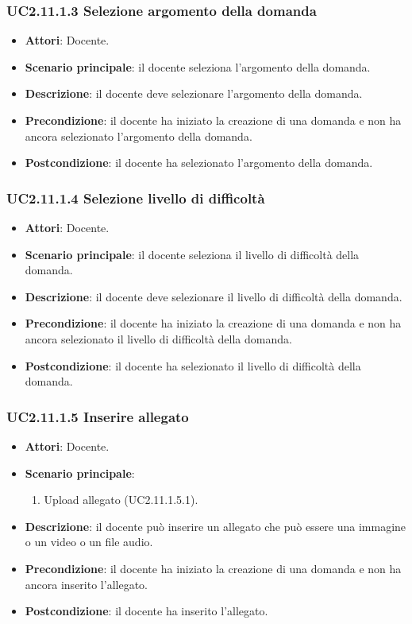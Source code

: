 \subsubsection{UC2.11.1.3 Selezione argomento della domanda}
\begin{itemize}
\item \textbf{Attori}: Docente.
\item \textbf{Scenario principale}: il docente seleziona l'argomento della domanda.
\item \textbf{Descrizione}: il docente deve selezionare l'argomento della domanda.
\item \textbf{Precondizione}: il docente ha iniziato la creazione di una domanda e non ha ancora selezionato l'argomento della domanda.
\item \textbf{Postcondizione}: il docente ha selezionato l'argomento della domanda.
\end{itemize}
\subsubsection{UC2.11.1.4 Selezione livello di difficoltà}
\begin{itemize}
\item \textbf{Attori}: Docente.
\item \textbf{Scenario principale}: il docente seleziona il livello di difficoltà della domanda.
\item \textbf{Descrizione}: il docente deve selezionare il livello di difficoltà della domanda.
\item \textbf{Precondizione}: il docente ha iniziato la creazione di una domanda e non ha ancora selezionato il livello di difficoltà della domanda.
\item \textbf{Postcondizione}: il docente ha selezionato il livello di difficoltà della domanda.
\end{itemize}
\subsubsection{UC2.11.1.5 Inserire allegato}
\begin{itemize}
\item \textbf{Attori}: Docente.
\item \textbf{Scenario principale}:
\begin{enumerate}
\item Upload allegato (UC2.11.1.5.1).
\end{enumerate}
\item \textbf{Descrizione}: il docente può inserire un allegato che può essere una immagine o un video o un file audio.
\item \textbf{Precondizione}: il docente ha iniziato la creazione di una domanda e non ha ancora inserito l'allegato.
\item \textbf{Postcondizione}: il docente ha inserito l'allegato.
\end{itemize}
